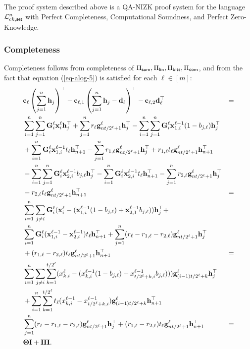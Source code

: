 \begin{theorem} \label{theo:bits}
The proof system described above is a QA-NIZK proof system for the language \(\mathcal{L}_{ck,\mathsf{set}}^n\)
 with Perfect Completeness, Computational Soundness, and Perfect Zero-Knowledge.
\end{theorem}	

\subsubsection{Completeness}
Completeness follows from completeness of \(\Pi_{\mathsf{sum}},\Pi_\mathsf{lin},\Pi_{\mathsf{bits}},\Pi_{\mathsf{com}}\), and from the fact that equation (\ref{eq-alog-5}) is satisfied for each \(\ell\in [m]\):
\begin{align*}
&\mathbf{c}_\ell\left(\sum_{j=1}^n \mathbf{h}_j\right)^\top-
\mathbf{c}_{\ell,1}\left(\sum_{j=1}^n\mathbf{h}_j-\mathbf{d}_\ell\right)^\top-
\mathbf{c}_{\ell,2}\mathbf{d}_\ell^\top &= \\
&\sum_{i=1}^n\sum_{j=1}^n\mathbf{{G}}^\ell_i\mathbf{x}^\ell_i\mathbf{h}_j^\top+\sum_{j=1}^nr_\ell\mathbf{g}_{nt /2^\ell+1}^\ell\mathbf{h}_j^\top
-\sum_{i=1}^n\sum_{j=1}^n\mathbf{{G}}^\ell_i\mathbf{x}^{\ell-1}_{1,i}(1-b_{j,\ell})\mathbf{h}_j^\top\\
&+\sum_{i=1}^n\mathbf{{G}}^\ell_i\mathbf{x}^{\ell-1}_{1,i} t_\ell\mathbf{h}_{n+1}^\top-\sum_{j=1}^nr_{1,\ell}\mathbf{g}^\ell_{nt /2^\ell+1}\mathbf{h}_j^\top+ r_{1,\ell}t_\ell\mathbf{g}^\ell_{nt /2^\ell+1}\mathbf{h}_{n+1}^\top\\
&-\sum_{i=1}^n\sum_{j=1}^n\mathbf{{G}}^\ell_i\mathbf{x}^{\ell-1}_{2,i}b_{j,\ell}\mathbf{h}_j^\top-\sum_{i=1}^n\mathbf{{G}}^\ell_i\mathbf{x}^{\ell-1}_{2,i} t_\ell\mathbf{h}_{n+1}^\top-\sum_{j=1}^nr_{2,\ell}\mathbf{g}^\ell_{nt /2^\ell+1}\mathbf{h}_j^\top\\
&- r_{2,\ell}t_\ell\mathbf{g}^\ell_{nt /2^\ell+1}\mathbf{h}_{n+1}^\top &=\\
&\sum_{i=1}^n\sum_{j\neq i}\mathbf{{G}}^\ell_i(\mathbf{x}^\ell_i-(\mathbf{x}^{\ell-1}_{1,i}(1-b_{j,\ell})+\mathbf{x}^{\ell-1}_{2,1}b_{j,\ell}))\mathbf{h}_j^\top+\\
&\sum_{i=1}^n\mathbf{{G}}^\ell_i(\mathbf{x}^{\ell-1}_{1,i}-\mathbf{x}^{\ell-1}_{2,i})t_\ell\mathbf{h}_{n+1}^\top+\sum_{j=1}^n(r_\ell-r_{1,\ell}-r_{2,\ell})\mathbf{g}_{nt /2^\ell+1}^\ell\mathbf{h}_{j}^\top\\
&+(r_{1,\ell}-r_{2,\ell})t_\ell\mathbf{g}^\ell_{nt /2^\ell+1}\mathbf{h}_{n+1}^\top &=\\
&\sum_{i=1}^n\sum_{j\neq i}\sum_{k=1}^{t /2^\ell}(x_{k,i}^\ell-(x_{k,i}^{\ell-1}(1-b_{j,\ell})+x_{t /2^\ell+k,i}^{\ell-1}b_{j,\ell})))\mathbf{g}_{(i-1)t /2^\ell+k}^\ell\mathbf{h}_j^\top\\
&+\sum_{i=1}^n\sum_{k=1}^{t /2^\ell}t_\ell(x_{k,i}^{\ell-1}-x_{t /2^\ell+k,i}^{\ell-1})\mathbf{g}_{(i-1)t /2^\ell+k}^\ell\mathbf{h}_{n+1}^\top\\
&\sum_{j=1}^n(r_\ell-r_{1,\ell}-r_{2,\ell})\mathbf{g}_{nt /2^\ell+1}^\ell\mathbf{h}_{j}^\top+(r_{1,\ell}-r_{2,\ell})t_\ell\mathbf{g}^\ell_{nt /2^\ell+1}\mathbf{h}_{n+1}^\top &=\\
&\mathbf{{\Theta}}\mathbf{{I}}+\mathbf{{I}}\mathbf{{\Pi}}.
\end{align*}

